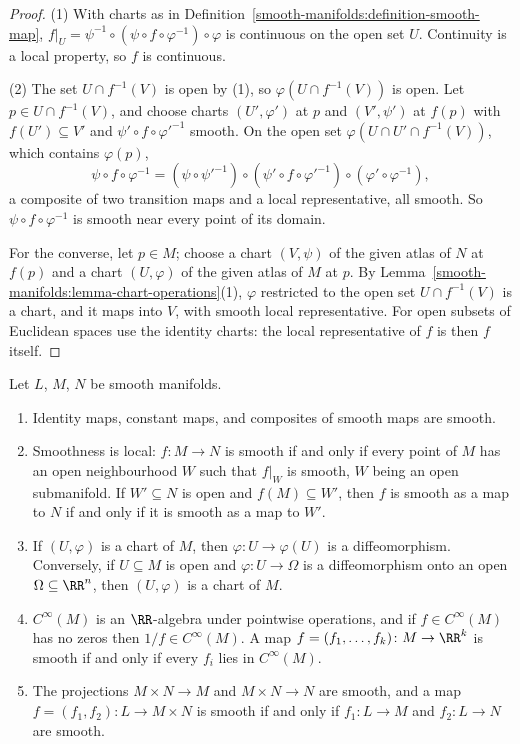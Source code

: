 \begin{proof}
(1) With charts as in Definition~\ref{smooth-manifolds:definition-smooth-map}, $f|_U = \psi^{-1} \circ (\psi \circ f \circ \varphi^{-1}) \circ \varphi$ is
continuous on the open set $U$. Continuity is a local property, so $f$ is continuous.

(2) The set $U \cap f^{-1}(V)$ is open by (1), so $\varphi(U \cap f^{-1}(V))$ is open. Let $p \in U \cap f^{-1}(V)$, and choose charts $(U', \varphi')$ at $p$ and
$(V', \psi')$ at $f(p)$ with $f(U') \subseteq V'$ and $\psi' \circ f \circ \varphi'^{-1}$ smooth. On the open set $\varphi(U \cap U' \cap f^{-1}(V))$, which
contains $\varphi(p)$,
\[
\psi \circ f \circ \varphi^{-1} = (\psi \circ \psi'^{-1}) \circ (\psi' \circ f \circ \varphi'^{-1}) \circ (\varphi' \circ \varphi^{-1}),
\]
a composite of two transition maps and a local representative, all smooth. So $\psi \circ f \circ \varphi^{-1}$ is smooth near every point of its domain.

For the converse, let $p \in M$; choose a chart $(V, \psi)$ of the given atlas of $N$ at $f(p)$ and a chart $(U, \varphi)$ of the given atlas of $M$ at $p$. By
Lemma~\ref{smooth-manifolds:lemma-chart-operations}(1), $\varphi$ restricted to the open set $U \cap f^{-1}(V)$ is a chart, and it maps into $V$, with smooth
local representative. For open subsets of Euclidean spaces use the identity charts: the local representative of $f$ is then $f$ itself.
\end{proof}

\begin{proposition}\label{smooth-manifolds:proposition-smooth-maps}
Let $L$, $M$, $N$ be smooth manifolds.
\begin{enumerate}
\item Identity maps, constant maps, and composites of smooth maps are smooth.
\item Smoothness is local: $f \colon M \to N$ is smooth if and only if every point of $M$ has an open neighbourhood $W$ such that $f|_W$ is smooth, $W$ being
an open submanifold. If $W' \subseteq N$ is open and $f(M) \subseteq W'$, then $f$ is smooth as a map to $N$ if and only if it is smooth as a map to $W'$.
\item If $(U, \varphi)$ is a chart of $M$, then $\varphi \colon U \to \varphi(U)$ is a diffeomorphism. Conversely, if $U \subseteq M$ is open and
$\varphi \colon U \to \Omega$ is a diffeomorphism onto an open $\Omega \subseteq \RR^n$, then $(U, \varphi)$ is a chart of $M$.
\item $C^\infty(M)$ is an $\RR$-algebra under pointwise operations, and if $f \in C^\infty(M)$ has no zeros then $1/f \in C^\infty(M)$. A map
$f = (f_1, \ldots, f_k) \colon M \to \RR^k$ is smooth if and only if every $f_i$ lies in $C^\infty(M)$.
\item The projections $M \times N \to M$ and $M \times N \to N$ are smooth, and a map $f = (f_1, f_2) \colon L \to M \times N$ is smooth if and only if
$f_1 \colon L \to M$ and $f_2 \colon L \to N$ are smooth.
\end{enumerate}
\end{proposition}

